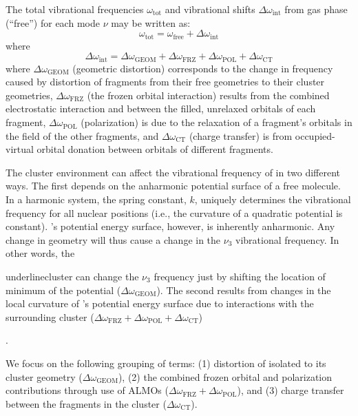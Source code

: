 \documentclass[%
  class = book,%
  crop = false,%
  float = true,%
  multi = true,%
  preview = false,%
]{standalone}
\let\cite\autocite
\begin{document}
{The total vibrational frequencies \(\omega_{\mathrm{tot}}\) and vibrational shifts \(\Delta \omega_\mathrm{int}\) from gas phase (``free'')  for each mode \(\nu\) may be written as:
\begin{equation}
  \omega_\mathrm{tot} = \omega_\mathrm{free} + \Delta \omega_\mathrm{int}
\end{equation}
where
\begin{equation}
  \Delta \omega_\mathrm{int} = \Delta \omega_\mathrm{GEOM} + \Delta \omega_\mathrm{FRZ} + \Delta \omega_\mathrm{POL} + \Delta \omega_\mathrm{CT}
\end{equation}
 where \(\Delta \omega_\mathrm{GEOM}\) (geometric distortion) corresponds to the change in frequency caused by distortion of fragments from their free geometries to their cluster geometries, \(\Delta \omega_\mathrm{FRZ}\) (the frozen orbital interaction) results from the combined electrostatic interaction and  between the filled, unrelaxed orbitals of each fragment, \(\Delta \omega_\mathrm{POL}\) (polarization) is due to the relaxation of a fragment's orbitals in the field of the other fragments, and \(\Delta \omega_\mathrm{CT}\) (charge transfer) is from occupied-virtual orbital donation between orbitals of different fragments.\cite{Ramos-Cordoba2011}

The cluster environment can affect the vibrational frequency of  in two different ways. The first depends on the anharmonic potential surface of a free  molecule. In a harmonic system, the spring constant, \(k\), uniquely determines the vibrational frequency for all nuclear positions (i.e., the curvature of a quadratic potential is constant). 's potential energy surface, however, is inherently anharmonic. Any change in geometry will thus cause a change in the \(\nu_3\) vibrational frequency. In other words, the \begin{akdjwarning}{underline}cluster can change the \(\nu_3\) frequency just by shifting the location of minimum of the  potential (\(\Delta \omega_\mathrm{GEOM}\)). The second results from changes in the local curvature of 's potential energy surface due to interactions with the surrounding cluster (\(\Delta \omega_\mathrm{FRZ} + \Delta\omega_\mathrm{POL} + \Delta \omega_\mathrm{CT}\))\end{akdjwarning}.

We focus on the following grouping of terms: (1) distortion of isolated  to its cluster geometry (\(\Delta \omega_\mathrm{GEOM}\)), (2) the combined frozen orbital and polarization contributions through use of ALMOs (\(\Delta \omega_\mathrm{FRZ} + \Delta \omega_\mathrm{POL}\)), and (3) charge transfer between the fragments in the cluster (\(\Delta \omega_\mathrm{CT}\)).

}
\end{document}

